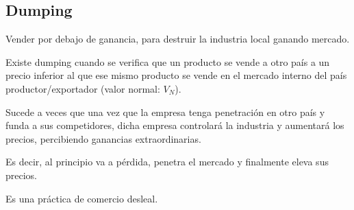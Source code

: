\subsection{Dumping}

Vender por debajo de ganancia,
para destruir la industria local ganando mercado.

Existe dumping cuando se verifica que un producto se vende a otro país a un precio inferior
al que ese mismo producto se vende en el mercado interno del país productor/exportador 
(valor normal: \(V_N\)).

Sucede a veces que una vez que la empresa tenga penetración en otro país y funda a sus competidores,
dicha empresa controlará la industria y aumentará los precios,
percibiendo ganancias extraordinarias.

Es decir,
al principio va a pérdida,
penetra el mercado
y finalmente eleva sus precios.

Es una práctica de comercio desleal.
